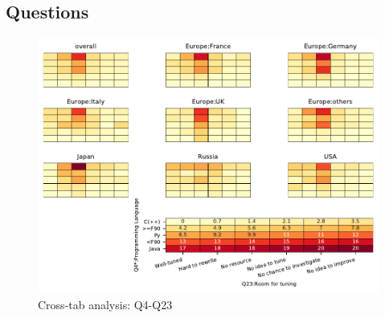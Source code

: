 
\subsection{Questions}


\begin{figure}
\begin{center}
\includegraphics[width=12cm]{../pdfs/Q4-Q23.pdf}
\caption{Cross-tab analysis: Q4-Q23}
\label{fig:Q4-Q23}
\end{center}
\end{figure}
